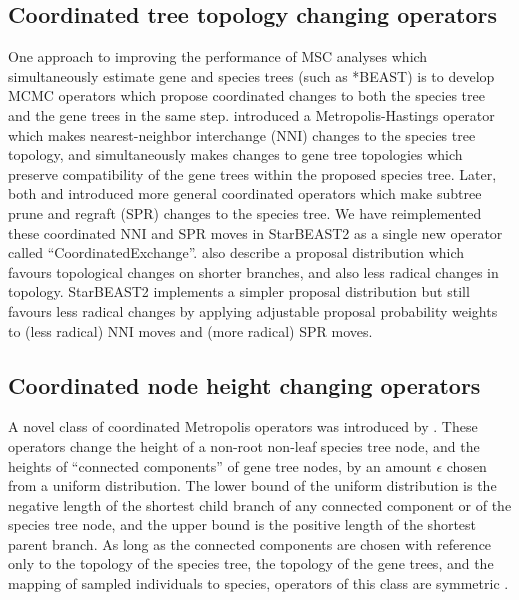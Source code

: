\documentclass[12pt]{article}
\begin{document}
\subsection{Coordinated tree topology changing operators}

One approach to improving the performance of MSC analyses which simultaneously
estimate gene and species trees (such as *BEAST) is to develop MCMC operators
which propose coordinated changes to both the species tree and the gene trees in
the same step. \cite{Yang01122014} introduced a Metropolis-Hastings \citep[MH;][]{Metropolis1953, Hastings1970}
operator which makes nearest-neighbor interchange (NNI) changes to the species
tree topology, and simultaneously makes changes to gene tree topologies which
preserve compatibility of the gene trees within the proposed species tree.
Later, both \cite{Jones2016} and \cite{2015arXiv151203843R} introduced more
general coordinated operators which make subtree prune and regraft (SPR) changes
to the species tree. We have reimplemented these coordinated NNI and SPR moves
in StarBEAST2 as a single new operator called ``CoordinatedExchange''.
\cite{2015arXiv151203843R} also describe a proposal distribution which favours
topological changes on shorter branches, and also less radical changes in
topology. StarBEAST2 implements a simpler proposal distribution but still
favours less radical changes by applying adjustable proposal probability weights
to (less radical) NNI moves and (more radical) SPR moves.

\subsection{Coordinated node height changing operators}

A novel class of coordinated Metropolis operators was introduced by
\cite{Jones2016}. These operators change the height of a non-root non-leaf
species tree node, and the heights of ``connected components'' of gene tree
nodes, by an amount $\epsilon$ chosen from a uniform distribution.
The lower bound of the uniform distribution is the negative length of
the shortest child branch of any connected component or of the species tree node,
and the upper bound is the positive length of the shortest parent branch. As
long as the connected components are chosen with reference only to the topology
of the species tree, the topology of the gene trees, and the mapping of
sampled individuals to species, operators of this class are symmetric
\citep{Jones2016}.
\end{document}
